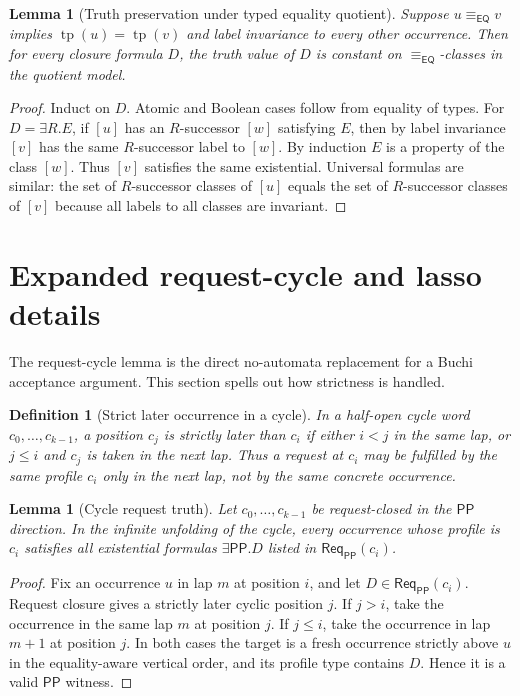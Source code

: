 \documentclass[11pt]{article}
\newtheorem{lemma}[theorem]{Lemma}
\newtheorem{definition}[theorem]{Definition}
\newcommand{\EQ}{\mathsf{EQ}}
\newcommand{\PP}{\mathsf{PP}}
\newcommand{\Req}{\mathsf{Req}}
\newcommand{\typ}{\operatorname{tp}}
\newcommand{\eqc}{\equiv_{\EQ}}
\begin{document}
\begin{lemma}[Truth preservation under typed equality quotient]
Suppose $u\eqc v$ implies $\typ(u)=\typ(v)$ and label invariance to every other occurrence.  Then for every closure formula $D$, the truth value of $D$ is constant on $\eqc$-classes in the quotient model.
\end{lemma}

\begin{proof}
Induct on $D$.  Atomic and Boolean cases follow from equality of types.  For $D=\exists R.E$, if $[u]$ has an $R$-successor $[w]$ satisfying $E$, then by label invariance $[v]$ has the same $R$-successor label to $[w]$.  By induction $E$ is a property of the class $[w]$.  Thus $[v]$ satisfies the same existential.  Universal formulas are similar: the set of $R$-successor classes of $[u]$ equals the set of $R$-successor classes of $[v]$ because all labels to all classes are invariant.
\end{proof}

\section{Expanded request-cycle and lasso details}

The request-cycle lemma is the direct no-automata replacement for a Buchi acceptance argument.  This section spells out how strictness is handled.

\begin{definition}[Strict later occurrence in a cycle]
In a half-open cycle word $c_0,\ldots,c_{k-1}$, a position $c_j$ is strictly later than $c_i$ if either $i<j$ in the same lap, or $j\le i$ and $c_j$ is taken in the next lap.  Thus a request at $c_i$ may be fulfilled by the same profile $c_i$ only in the next lap, not by the same concrete occurrence.
\end{definition}

\begin{lemma}[Cycle request truth]
Let $c_0,\ldots,c_{k-1}$ be request-closed in the $\PP$ direction.  In the infinite unfolding of the cycle, every occurrence whose profile is $c_i$ satisfies all existential formulas $\exists\PP.D$ listed in $\Req_\PP(c_i)$.
\end{lemma}

\begin{proof}
Fix an occurrence $u$ in lap $m$ at position $i$, and let $D\in\Req_\PP(c_i)$.  Request closure gives a strictly later cyclic position $j$.  If $j>i$, take the occurrence in the same lap $m$ at position $j$.  If $j\le i$, take the occurrence in lap $m+1$ at position $j$.  In both cases the target is a fresh occurrence strictly above $u$ in the equality-aware vertical order, and its profile type contains $D$.  Hence it is a valid $\PP$ witness.
\end{proof}
\end{document}
